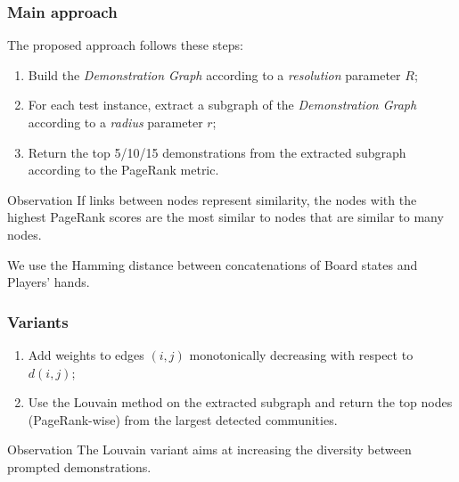 \documentclass{beamer}
\theoremstyle{definition}
\theoremstyle{plain}
\theoremstyle{Remark}
\begin{document}
	\begin{frame}
		\frametitle{Main approach}
		The proposed approach follows these steps:
		\begin{enumerate}
			\item Build the \emph{Demonstration Graph} according to a \emph{resolution} parameter $R$;\pause
			\item For each test instance, extract a subgraph of the \emph{Demonstration Graph} according to a \emph{radius} parameter $r$;\pause
			\item Return the top 5/10/15 demonstrations from the extracted subgraph according to the PageRank metric.\pause
		\end{enumerate}
		
		\begin{block}{Observation}
			If links between nodes represent similarity, the nodes with the highest PageRank scores are the most similar to nodes that are similar to many nodes.
			\end{block}\pause
		
	We use the Hamming distance between concatenations of Board states and Players' hands.
		
	\end{frame}
	
	\begin{frame}
		\frametitle{Variants}
		\pause
		\begin{enumerate}
			\item Add weights to edges $(i,j)$ monotonically decreasing with respect to $d(i,j)$;\pause
			\item Use the Louvain method on the extracted subgraph and return the top nodes (PageRank-wise) from the largest detected communities.\pause \bigskip
		\end{enumerate}
	\begin{block}{Observation}
		The Louvain variant aims at increasing the diversity between prompted demonstrations.
	\end{block}
	\end{frame}
	
\end{document}
